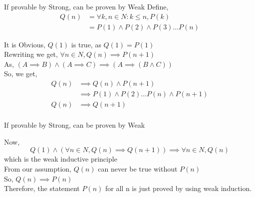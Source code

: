 \documentclass{beamer}
\begin{document}
\begin{frame}{If provable by Strong, can be proven by Weak}
    Define, 
    \begin{equation*} \label{eq1}
        \begin{split}
            Q(n) & = \forall k, n \in N : k \leq n, P(k) \\
            & = P(1) \land P(2) \land P(3) \ldots P(n)
\end{split}
\end{equation*}

It is Obvious, $Q(1)$ is true, as $Q(1) = P(1)$\\
Rewriting we get, $\forall n \in N, Q(n) \implies P(n+1)$\\
As, $(A\implies B) \land (A\implies C) \implies (A \implies (B \land C))$\\
So, we get,
\begin{equation*}
    \begin{split}
        Q(n) &\implies Q(n) \land P(n+1)\\
        &\implies P(1) \land P(2) \ldots P(n) \land P(n+1) \\
        Q(n) &\implies Q(n+1)\\
    \end{split}
\end{equation*}
\end{frame}

\begin{frame}{If provable by Strong, can be proven by Weak}

Now, 
$$Q(1) \land (\forall n \in N, Q(n) \implies Q(n+1)) \implies \forall n \in N, Q(n)$$
which is the weak inductive principle
\\
From our assumption, $Q(n)$ can never be true without $P(n)$\\
So, $Q(n) \implies P(n)$\\
Therefore, the statement $P(n)$ for all n is just proved by using weak induction.
\end{frame}
\end{document}

